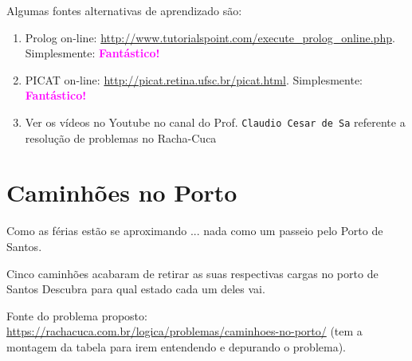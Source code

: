 \documentclass[a4paper,12pt]{article}
\begin{document}
Algumas fontes alternativas de aprendizado s\~ao:

\begin{enumerate}



\item Prolog on-line: \url{http://www.tutorialspoint.com/execute_prolog_online.php}. Simplesmente: \textbf{\textcolor{magenta}{Fantástico!}}

\item PICAT on-line: \url{http://picat.retina.ufsc.br/picat.html}. Simplesmente: \textbf{\textcolor{magenta}{Fantástico!}}



 
 \item Ver os vídeos no Youtube no canal do Prof. \texttt{Claudio Cesar de Sa} referente
 a resolução de problemas no Racha-Cuca

\end{enumerate}





\newpage
\tableofcontents


\newpage
\section{Caminhões no Porto}


Como as férias estão se aproximando ... nada como um passeio
pelo Porto de Santos.

Cinco caminhões acabaram de retirar as suas respectivas cargas no porto de Santos
Descubra para qual estado cada um deles vai.

 Fonte do problema proposto:\\
  \url{https://rachacuca.com.br/logica/problemas/caminhoes-no-porto/}
 (tem a montagem da tabela para irem entendendo e depurando o problema).\\
\end{document}

